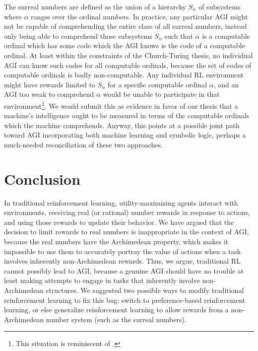 \documentclass[reqno]{article}
\theoremstyle{definition}
\begin{document}
The surreal numbers are defined as the
union of a hierarchy $S_\alpha$ of subsystems where $\alpha$ ranges over the
ordinal numbers. In practice, any particular AGI might not be capable of comprehending the
entire class of all surreal numbers, instead only being able to comprehend those
subsystems $S_\alpha$ such that $\alpha$ is a computable ordinal which has some
code which the AGI knows is the code of a computable ordinal. At least within the
constraints of the Church-Turing thesis, no individual AGI can know such codes
for all computable ordinals, because the set of codes of computable ordinals is
badly non-computable. Any individual RL environment might have rewards limited
to $S_\alpha$ for a specific computable ordinal $\alpha$, and an AGI too weak to
comprehend $\alpha$ would be unable to participate in that
environment\footnote{This situation is reminiscent of \cite{hibbard2011measuring}.}.
We would submit this as evidence in favor of our thesis \cite{alexander2019measuring}
that a machine's intelligence ought to be measured in terms of the computable ordinals
which the machine comprehends. Anyway, this points at a possible joint path
toward AGI incorporating both machine learning and symbolic logic, perhaps
a much-needed reconciliation of these two approaches.


\section{Conclusion}
\label{conclusionsection}

In traditional reinforcement learning, utility-maximizing agents interact
with environments, receiving real (or rational) number rewards in response to
actions, and using those rewards to update their behavior. We have argued that
the decision to limit rewards to real numbers is inappropriate in the context
of AGI, because the real numbers have the Archimedean property, which makes it
impossible to use them to accurately portray the value of actions when a task
involves inherently non-Archimedean rewards. Thus, we argue, traditional
RL cannot possibly lead to AGI, because a genuine AGI should have no trouble
at least making attempts to engage in tasks that inherently involve
non-Archimedean structures. We suggested two possible ways
to modify traditional reinforcement learning to fix this bug: switch to
preference-based reinforcement learning, or else generalize reinforcement learning
to allow rewards from a non-Archimedean number system (such as the surreal numbers).




\end{document}
